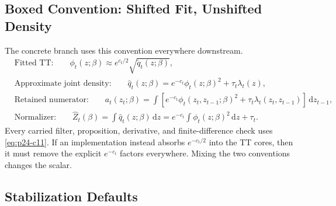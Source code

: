 \documentclass[11pt]{article}
\newcommand{\dd}{\,\mathrm d}
\begin{document}
\subsection{Boxed Convention: Shifted Fit, Unshifted Density}

The concrete branch uses this convention everywhere downstream.
\[
\boxed{
\begin{aligned}
&\text{Fitted TT:}\qquad
  \phi_t(z;\beta)\approx e^{c_t/2}\sqrt{\widetilde q_t(z;\beta)},\\
&\text{Approximate joint density:}\qquad
  \widehat q_t(z;\beta)
  =
  e^{-c_t}\phi_t(z;\beta)^2+\tau_t\lambda_t(z),\\
&\text{Retained numerator:}\qquad
  a_t(z_t;\beta)
  =
  \int
  \left[e^{-c_t}\phi_t(z_t,z_{t-1};\beta)^2
        +\tau_t\lambda_t(z_t,z_{t-1})\right]\dd z_{t-1},\\
&\text{Normalizer:}\qquad
  \widehat Z_t(\beta)
  =
  \int \widehat q_t(z;\beta)\dd z
  =
  e^{-c_t}\int\phi_t(z;\beta)^2\dd z+\tau_t.
\end{aligned}}
\label{eq:p24-c11}
\]
Every carried filter, proposition, derivative, and finite-difference check uses
\eqref{eq:p24-c11}.  If an implementation instead absorbs \(e^{-c_t/2}\) into the TT cores,
then it must remove the explicit \(e^{-c_t}\) factors everywhere.  Mixing the
two conventions changes the scalar.

\subsection*{Stabilization Defaults}
\end{document}
